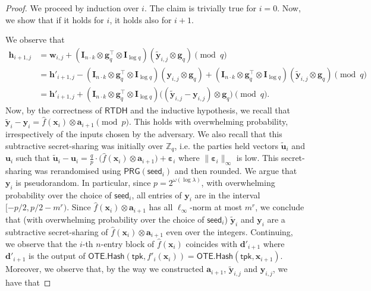 \documentclass{theoretics}
\newcommand{\OTE}{\mathsf{OTE}}
\newcommand{\Z}{\mathbb{Z}}
\renewcommand{\sec}{\ensuremath{\lambda}}
\newcommand{\RTDH}{\mathsf{RTDH}}
\newcommand{\algofont}[1]{\ensuremath{\mathsf{#1}}}
\newcommand{\tpk}{{\algofont{tpk}}}
\newcommand{\Hash}{{\algofont{Hash}}}
\newcommand{\id}{\ensuremath{\mathbf{I}}}
\begin{document}
\begin{proof}
We proceed by induction over $i$. The claim is trivially true for $i=0$. Now, we show that if it holds for $i$, it holds also for $i+1$.

We observe that
\begin{align*}
\mathbf{h}_{i+1,j}
&=\mathbf{w}_{i,j}+(\id_{n\cdot k}\otimes \mathbf g_q^\intercal\otimes \id_{\log q})(\tilde{\mathbf{y}}_{i,j}\otimes \mathbf g_q)\pmod q\\
&=\mathbf{h}'_{i+1,j}
-(\id_{n\cdot k}\otimes \mathbf g_q^\intercal\otimes \id_{\log q})(\mathbf y_{i,j}\otimes \mathbf g_q)
+(\id_{n\cdot k}\otimes \mathbf g_q^\intercal\otimes \id_{\log q})(\tilde{\mathbf{y}}_{i,j}\otimes \mathbf g_q)\pmod q\\
&=\mathbf{h}'_{i+1,j}
+(\id_{n\cdot k}\otimes \mathbf g_q^\intercal\otimes \id_{\log q})\bigl((\tilde{\mathbf{y}}_{i,j}-\mathbf y_{i,j})\otimes \mathbf g_q\bigr)\pmod q.
\end{align*}
Now, by the correctness of $\RTDH$ and the inductive hypothesis, we recall that $ \tilde{\mathbf{y}}_i-\mathbf{y}_i=\hat{f}(\mathbf{x}_i)\otimes \mathbf{a}_{i+1}\pmod p$. {This holds with overwhelming probability, irrespectively of the inputs chosen by the adversary.} We also recall that this subtractive secret-sharing was initially over $\Z_q$, i.e. the parties held vectors $\tilde{\mathbf{u}}_i$ and $\mathbf{u}_i$ such that $\tilde{\mathbf{u}}_i-\mathbf{u}_i=\frac{q}{p}\cdot\bigl(\hat{f}(\mathbf{x}_i)\otimes \mathbf{a}_{i+1}\bigr)+\bm{\varepsilon}_i$ where $\lVert \bm{\varepsilon}_i\rVert_\infty$ is low. This secret-sharing was rerandomised using $\mathsf{PRG}(\mathsf{seed}_i)$ and then rounded. We argue that $\mathbf{y}_i$ is pseudorandom. {In particular, since $p=2^{\omega(\log \sec)}$, with overwhelming probability over the choice of $\mathsf{seed}_i$, all entries of $\mathbf{y}_i$ are in the interval $[-p/2, p/2-m^r)$. Since $\hat{f}(\mathbf{x}_i)\otimes \mathbf{a}_{i+1}$ has all $\ell_\infty$-norm at most $m^{r}$, we conclude that (with overwhelming probability over the choice of $\mathsf{seed}_i$)} $\tilde{\mathbf{y}}_i$ and $\mathbf{y}_i$ are a subtractive secret-sharing of $\hat{f}(\mathbf{x}_i)\otimes \mathbf{a}_{i+1}$ even over the integers. Continuing, we observe that the $i$-th $n$-entry block of $\hat{f}(\mathbf{x}_i)$ coincides with $\mathbf{d}'_{i+1}$ where $\mathbf{d}'_{i+1}$ is the output of $\OTE.\Hash(\tpk, f'_i(\mathbf{x}_i))=\OTE.\Hash(\tpk, \mathbf{x}_{i+1})$. Moreover, we observe that, by the way we constructed $\mathbf{a}_{i+1}$, $\tilde{\mathbf{y}}_{i, j}$ and $\mathbf{y}_{i, j}$, we have that 

\end{proof}
\end{document}

